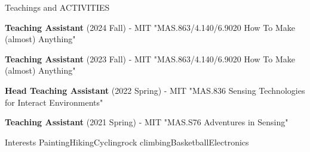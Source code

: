 \documentclass{resume} %
\begin{document}
\begin{rSection}{Teachings and ACTIVITIES}

\begin{itemlabel}
\item \textbf{Teaching Assistant} (2024 Fall) - MIT "MAS.863/4.140/6.9020 How To Make (almost) Anything"
\smallskip
\smallskip

\item \textbf{Teaching Assistant} (2023 Fall) - MIT "MAS.863/4.140/6.9020 How To Make (almost) Anything"
\smallskip
\smallskip

\item \textbf{Head Teaching Assistant} (2022 Spring) - MIT "MAS.836 Sensing Technologies for Interact Environments"
\smallskip
\smallskip

\item \textbf{Teaching Assistant} (2021 Spring) - MIT "MAS.S76 Adventures in Sensing"

\end{itemlabel}
\end{rSection}

\begin{rSection}{Interests}
Painting\hspace{0.5cm}Hiking\hspace{0.5cm}Cycling\hspace{0.5cm}rock climbing\hspace{0.5cm}Basketball\hspace{0.5cm}Electronics
\end{rSection}

\end{document}
